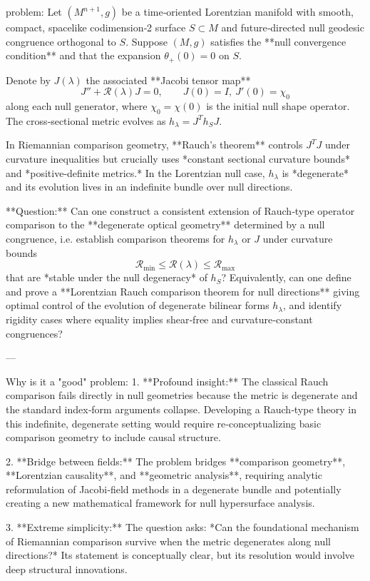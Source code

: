 problem:  
Let \((M^{n+1}, g)\) be a time‑oriented Lorentzian manifold with smooth, compact, spacelike codimension‑2 surface \(S\subset M\) and future‑directed null geodesic congruence orthogonal to \(S\).  Suppose \((M,g)\) satisfies the **null convergence condition** and that the expansion \(\theta_+(0)=0\) on \(S\).  

Denote by \(J(\lambda)\) the associated **Jacobi tensor map**
\[
J''+\mathcal R(\lambda)J=0,\qquad J(0)=I,\ J'(0)=\chi_0
\]
along each null generator, where \(\chi_0=\chi(0)\) is the initial null shape operator.  The cross‑sectional metric evolves as \(h_\lambda = J^T h_S J\).  

In Riemannian comparison geometry, **Rauch’s theorem** controls \(J^T J\) under curvature inequalities but crucially uses *constant sectional curvature bounds* and *positive‑definite metrics.*  In the Lorentzian null case, \(h_\lambda\) is *degenerate* and its evolution lives in an indefinite bundle over null directions.

**Question:**  
Can one construct a consistent extension of Rauch‑type operator comparison to the **degenerate optical geometry** determined by a null congruence, i.e. establish comparison theorems for \(h_\lambda\) or \(J\) under curvature bounds
\[
\mathcal R_{\min}\le\mathcal R(\lambda)\le\mathcal R_{\max}
\]
that are *stable under the null degeneracy* of \(h_S\)?  
Equivalently, can one define and prove a **Lorentzian Rauch comparison theorem for null directions** giving optimal control of the evolution of degenerate bilinear forms \(h_\lambda\), and identify rigidity cases where equality implies shear‑free and curvature‑constant congruences?  

---

Why is it a "good" problem:  
1. **Profound insight:** The classical Rauch comparison fails directly in null geometries because the metric is degenerate and the standard index‑form arguments collapse.  Developing a Rauch‑type theory in this indefinite, degenerate setting would require re‑conceptualizing basic comparison geometry to include causal structure.  

2. **Bridge between fields:**  The problem bridges **comparison geometry**, **Lorentzian causality**, and **geometric analysis**, requiring analytic reformulation of Jacobi‑field methods in a degenerate bundle and potentially creating a new mathematical framework for null hypersurface analysis.  

3. **Extreme simplicity:**  The question asks: *Can the foundational mechanism of Riemannian comparison survive when the metric degenerates along null directions?*  Its statement is conceptually clear, but its resolution would involve deep structural innovations.  

